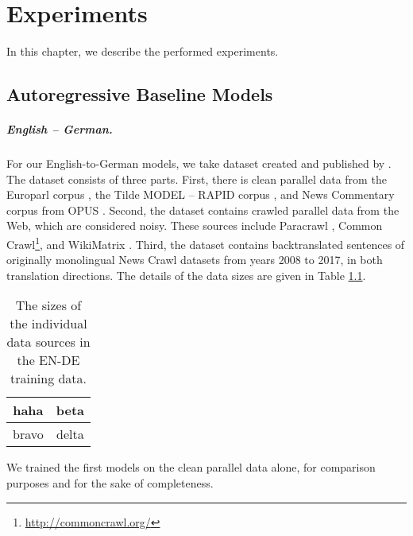 \chapter{Experiments}
\label{chap:experiments}

In this chapter, we describe the performed experiments. 

\section{Autoregressive Baseline Models}
\label{sec:exp:autoregressive}

\paragraph{English -- German.} For our English-to-German models, we take
dataset created and published by \citet{germann2020university}. The dataset
consists of three parts. First, there is clean parallel data from the Europarl
corpus \citep{koehn2005europarl}, the Tilde MODEL -- RAPID corpus
\citep{rozis-skadins-2017-tilde}, and News Commentary corpus from OPUS
\citep{tiedemann2012opus}. Second, the dataset contains crawled parallel data
from the Web, which are considered noisy. These sources include Paracrawl
\citep{espla-etal-2019-paracrawl}, Common
Crawl\footnote{\url{http://commoncrawl.org/}}, and WikiMatrix
\citep{schwenk2019wikimatrix}. Third, the dataset contains backtranslated
sentences of originally monolingual News Crawl datasets from years 2008 to
2017, in both translation directions. The details of the data sizes are given
in Table \ref{tab:ende-data-sizes}.

\begin{table}
  \centering
  \begin{tabular}{cc}
    \toprule
    haha & beta \\
    \midrule
    bravo & delta \\
    \bottomrule
  \end{tabular}

  \caption{The sizes of the individual data sources in the EN-DE training
    data.}%
  \label{tab:ende-data-sizes}
\end{table}

We trained the first models on the clean parallel data alone, for comparison
purposes and for the sake of completeness.


